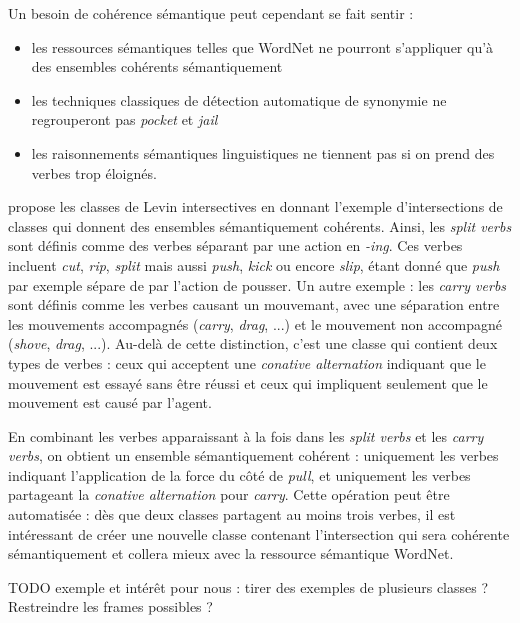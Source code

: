 Un besoin de cohérence sémantique peut cependant se fait sentir :

\begin{itemize}

    \item les ressources sémantiques telles que WordNet ne pourront s'appliquer
        qu'à des ensembles cohérents sémantiquement

    \item les techniques classiques de détection automatique de synonymie ne
        regrouperont pas \textit{pocket} et \textit{jail}

    \item les raisonnements sémantiques linguistiques ne tiennent pas si on
        prend des verbes trop éloignés.

\end{itemize}

\cite{dang1998investigating} propose les classes de Levin intersectives en
donnant l'exemple d'intersections de classes qui donnent des ensembles
sémantiquement cohérents. Ainsi, les \textit{split verbs} sont définis comme
des verbes séparant par une action en \textit{-ing}. Ces verbes incluent
\textit{cut}, \textit{rip}, \textit{split} mais aussi \textit{push},
\textit{kick} ou encore \textit{slip}, étant donné que \textit{push} par
exemple sépare de par l'action de pousser. Un autre exemple : les \textit{carry
verbs} sont définis comme les verbes causant un mouvemant, avec une séparation
entre les mouvements accompagnés (\textit{carry}, \textit{drag}, ...) et le
mouvement non accompagné (\textit{shove}, \textit{drag}, ...). Au-delà de cette
distinction, c'est une classe qui contient deux types de verbes : ceux qui
acceptent une \textit{conative alternation} indiquant que le mouvement est
essayé sans être réussi et ceux qui impliquent seulement que le mouvement est
causé par l'agent.

En combinant les verbes apparaissant à la fois dans les \textit{split verbs} et
les \textit{carry verbs}, on obtient un ensemble sémantiquement cohérent :
uniquement les verbes indiquant l'application de la force du côté de
\textit{pull}, et uniquement les verbes partageant la \textit{conative
alternation} pour \textit{carry}. Cette opération peut être automatisée : dès
que deux classes partagent au moins trois verbes, il est intéressant de créer
une nouvelle classe contenant l'intersection qui sera cohérente sémantiquement
et collera mieux avec la ressource sémantique WordNet.


TODO exemple et intérêt pour nous : tirer des exemples de plusieurs classes ?
Restreindre les frames possibles ?

